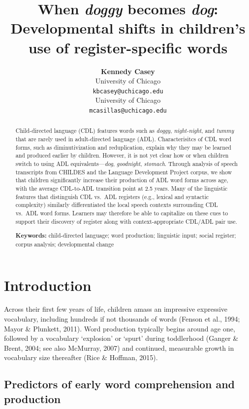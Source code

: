 \documentclass[10pt, letterpaper]{article}
\title{When \emph{doggy} becomes \emph{dog}: Developmental shifts in
children's use of register-specific words}
\author{{\large \bf Kennedy Casey} \\ University of Chicago \\ \texttt{kbcasey@uchicago.edu} \And {\large \bf Marisa Casillas} \\ University of Chicago \\ \texttt{mcasillas@uchicago.edu}}
\begin{document}
\maketitle

\begin{abstract}
Child-directed language (CDL) features words such as \emph{doggy},
\emph{night-night}, and \emph{tummy} that are rarely used in
adult-directed language (ADL). Characterisitcs of CDL word forms, such
as diminutivization and reduplication, explain why they may be learned
and produced earlier by children. However, it is not yet clear how or
when children switch to using ADL equivalents---\emph{dog},
\emph{goodnight}, \emph{stomach}. Through analysis of speech transcripts
from CHILDES and the Language Development Project corpus, we show that
children significantly increase their production of ADL word forms
across age, with the average CDL-to-ADL transition point at 2.5 years.
Many of the linguistic features that distinguish CDL vs.~ADL registers
(e.g., lexical and syntactic complexity) similarly differentiated the
local speech contexts surrounding CDL vs.~ADL word forms. Learners may
therefore be able to capitalize on these cues to support their discovery
of register along with context-appropriate CDL/ADL pair use.

\textbf{Keywords:}
child-directed language; word production; linguistic input; social
register; corpus analysis; developmental change
\end{abstract}

\hypertarget{introduction}{%
\section{Introduction}\label{introduction}}

Across their first few years of life, children amass an impressive
expressive vocabulary, including hundreds if not thousands of words
(Fenson et al., 1994; Mayor \& Plunkett, 2011). Word production
typically begins around age one, followed by a vocabulary `explosion' or
`spurt' during toddlerhood (Ganger \& Brent, 2004; see also McMurray,
2007) and continued, measurable growth in vocabulary size thereafter
(Rice \& Hoffman, 2015).

\hypertarget{predictors-of-early-word-comprehension-and-production}{%
\subsection{Predictors of early word comprehension and
production}\label{predictors-of-early-word-comprehension-and-production}}
\end{document}
